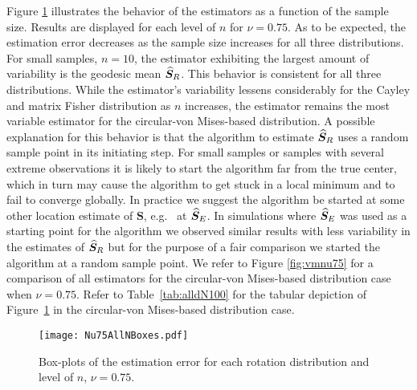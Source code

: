 Figure \ref{fig:NBoxes} illustrates the behavior of the estimators as a function of the sample size. Results are displayed for each level of $n$ for  $\nu=0.75$. As to be expected, the estimation error decreases as the sample size increases for all three distributions. For small samples, $n=10$, the estimator exhibiting the largest amount of variability is the geodesic mean ${\widehat{\bm S}_R}$. This behavior is consistent for all three distributions.  While the estimator's variability lessens considerably for the Cayley and matrix Fisher distribution as $n$ increases, the estimator remains the most variable estimator for the circular-von Mises-based distribution.  A possible explanation for this behavior is that the algorithm to estimate ${\widehat{\bm S}_R}$ uses a random sample point in its initiating step.  For small samples or samples with several extreme observations it is likely to start the algorithm far from the true center, which in turn may cause the algorithm to get stuck in a local minimum and to fail to converge globally.  In practice we suggest the algorithm be started at some other location estimate of $\bm S$, e.g.~ at ${\widehat{\bm S}_E}$. In simulations where ${\widehat{\bm S}_E}$ was used as a starting point for the algorithm we observed  similar results with less variability in the estimates of ${\widehat{\bm S}_R}$ but for the purpose of a fair comparison we started the algorithm at a random sample point.  We refer to Figure \ref{fig:vmnu75} for a comparison of all estimators for the circular-von Mises-based distribution case when $\nu=0.75$.  Refer to Table~\ref{tab:alldN100} for the tabular depiction of Figure~\ref{fig:NBoxes} in the circular-von Mises-based distribution case.


\begin{figure}[h!]
\centering
\texttt{[image: Nu75AllNBoxes.pdf]}
\caption{Box-plots of the estimation error for each rotation distribution and level of $n$,  $\nu=0.75$.}
\label{fig:NBoxes}
\end{figure}

